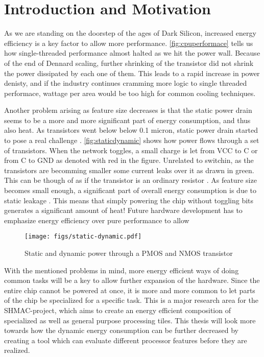 \section{Introduction and Motivation}







As we are standing on the doorstep of the ages of Dark Silicon, increased energy
efficiency is a key factor to allow more performance.
\autoref{fig:cpuperformace} tells us how single-threaded performance almost
halted as we hit the power wall. Because of the end of Dennard scaling, further
shrinking of the transistor did not shrink the power dissipated by each one of
them. This leads to a rapid increase in power denisty, and if the industry
continues cramming more logic to single threaded performace, wattage per area
would be too high for common cooling techniques.

Another problem arising as feature size decreases is that the static power drain
seems to be a more and more significant part of energy consumption, and thus
also heat. As transistors went below below 0.1 micron, static power drain
started to pose a real challenge \cite{kim2003leakage,martin2002combined}.
\autoref{fig:staticdynamic} shows how power flows through a set of transistors.
When the network toggles, a small charge is let from VCC to C or from C to GND
as denoted with red in the figure.  Unrelated to switchin, as the transistors
are becomming smaller some current leaks over it as drawn in green. This can be
though of as if the transistor is an ordinary resistor \cite{wolf}. As feature
size becomes small enough, a significant part of overall energy consumption is
due to static leakage \cite{nguyen2003minimization}. This means that simply
powering the chip without toggling bits generates a significant amount of heat!
Future hardware development has to emphasize energy efficiency over pure
performance to allow 


\begin{figure}
    \centering
    \texttt{[image: figs/static-dynamic.pdf]}
    \caption{Static and dynamic power through a PMOS and NMOS transistor}
    \label{fig:staticdynamic}
\end{figure}

With the mentioned problems in mind, more energy efficient ways of doing common
tasks will be a key to allow further expansion of the hardware.  Since the
entire chip cannot be powered at once, it is more and more common to let parts
of the chip be specialized for a specific task. This is a major research area
for the SHMAC-project, which aims to create an energy efficient composition of
specialized as well as general purpose processing tiles. This thesis will
look more towards how the dynamic energy consumption can be further decreased
by creating a tool which can evaluate different processor features before they
are realized.


